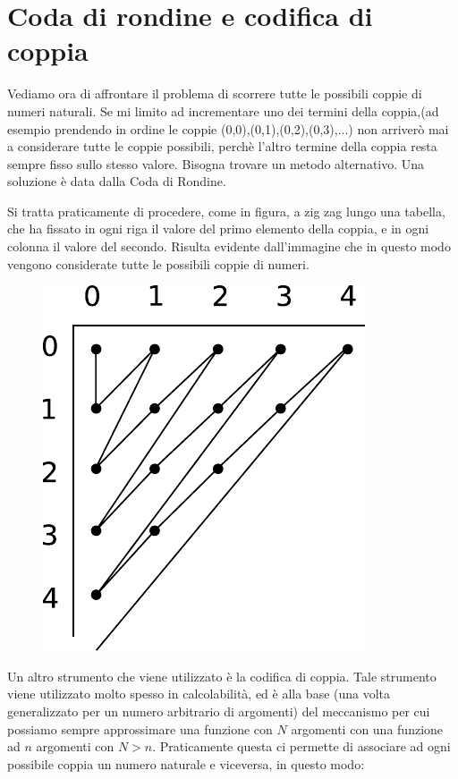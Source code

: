 \section{Coda di rondine e codifica di coppia}

Vediamo ora di affrontare il problema di scorrere tutte le possibili coppie di numeri naturali. Se mi limito ad incrementare uno dei termini della coppia,(ad esempio prendendo in ordine le coppie (0,0),(0,1),(0,2),(0,3),...) non arriver\`o mai a considerare tutte le coppie possibili, perch\`e l'altro termine della coppia resta sempre fisso sullo stesso valore. Bisogna trovare un metodo alternativo. Una soluzione \`e data dalla Coda di Rondine.

Si tratta praticamente di procedere, come in figura, a zig zag lungo una tabella, che ha fissato in ogni riga il valore del primo elemento della coppia, e in ogni colonna il valore del secondo. Risulta evidente dall'immagine che in questo modo vengono considerate tutte le possibili coppie di numeri.

\begin{figure}
\includegraphics{img/dovetail.pdf}
\end{figure}

Un altro strumento che viene utilizzato \`e la codifica di coppia. Tale strumento viene utilizzato molto spesso in calcolabilit\`a, ed \`e alla base (una volta generalizzato per un numero arbitrario di argomenti) del meccanismo per cui possiamo sempre approssimare una funzione con $N$ argomenti con una funzione ad $n$ argomenti con $N>n$. Praticamente questa ci permette di associare ad ogni possibile coppia un numero naturale e viceversa, in questo modo:


